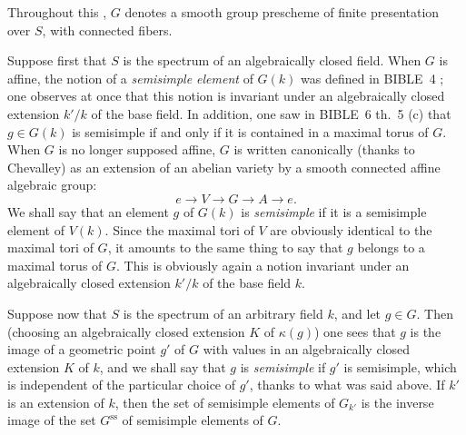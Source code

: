 Throughout this \No, $G$ denotes a smooth group prescheme of finite presentation over $S$, with connected fibers.

Suppose first that $S$ is the spectrum of an algebraically closed field. When $G$ is affine, the notion of a \emph{semisimple element} of $G(k)$ was defined in BIBLE~4 ; one observes at once that this notion is invariant under an algebraically closed extension $k'/k$ of the base field. In addition, one saw in BIBLE~6 th.~5 (c) that $g\in G(k)$ is semisimple if and only if it is contained in a maximal torus of $G$. When $G$ is no longer supposed affine, $G$ is written canonically (thanks to Chevalley) as an extension of an abelian variety by a smooth connected affine algebraic group:
\begin{equation}\tag{*}
e\to V\to G\to A\to e.
\end{equation}
We shall say that an element $g$ of $G(k)$ is \emph{semisimple} if it is a semisimple element of $V(k)$. Since the maximal tori of $V$ are obviously identical to the maximal tori of $G$, it amounts to the same thing to say that $g$ belongs to a maximal torus of $G$. This is obviously again a notion invariant under an algebraically closed extension $k'/k$ of the base field $k$.

Suppose now that $S$ is the spectrum of an arbitrary field $k$, and let $g\in G$. Then (choosing an algebraically closed extension $K$ of $\kappa(g)$) one sees that $g$ is the image of a geometric point $g'$ of $G$ with values in an algebraically closed extension $K$ of $k$, and we shall say that $g$ is \emph{semisimple} if $g'$ is semisimple, which is independent of the particular choice of $g'$, thanks to what was said above. If $k'$ is an extension of $k$, then the set of semisimple elements of $G_{k'}$ is the inverse image of the set $G^{\mathrm{ss}}$ of semisimple elements of $G$.

